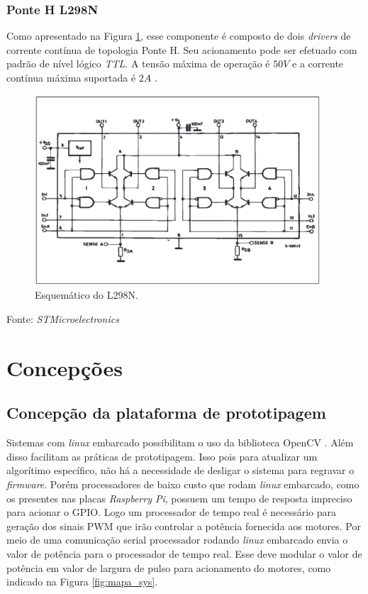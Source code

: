 \pagebreak

\subsection{Ponte H L298N}

Como apresentado na Figura \ref{fig:L298N_block_diagram}, esse componente é composto de dois \textit{drivers} de corrente contínua de topologia Ponte H. Seu acionamento pode ser efetuado com padrão de nível lógico \textit{TTL}. A tensão máxima de operação é $50V$ e a corrente contínua máxima suportada é $2A$ \cite{stmicroelectronics2000}.

\begin{figure}[!htb]
  \centering
  \caption{Esquemático do L298N.}
  \label{fig:L298N_block_diagram}
  \includegraphics[width=0.95\textwidth]{./img/fundamentacao/L298N_block_diagram.png}
\end{figure}
Fonte: \textit{STMicroelectronics}


\chapter{Concepções}

\section{Concepção da plataforma de prototipagem}

Sistemas com \textit{linux} embarcado possibilitam o uso da biblioteca OpenCV \cite{Suryatali2015}. Além disso facilitam as práticas de prototipagem. Isso pois para atualizar um algorítimo específico, não há a necessidade de desligar o sistema para regravar o \textit{firmware}.
Porém processadores de baixo custo que rodam \textit{linux} embarcado, como os presentes nas placas \textit{Raspberry Pi}, possuem um tempo de resposta impreciso para acionar o GPIO. Logo um processador de tempo real é necessário para geração dos sinais PWM que irão controlar a potência fornecida aos motores. Por meio de uma comunicação serial processador rodando \textit{linux} embarcado envia o valor de potência para o processador de tempo real. Esse deve modular o valor de potência em valor de largura de pulso para acionamento do motores, como indicado na Figura \ref{fig:mapa_sys}. 

